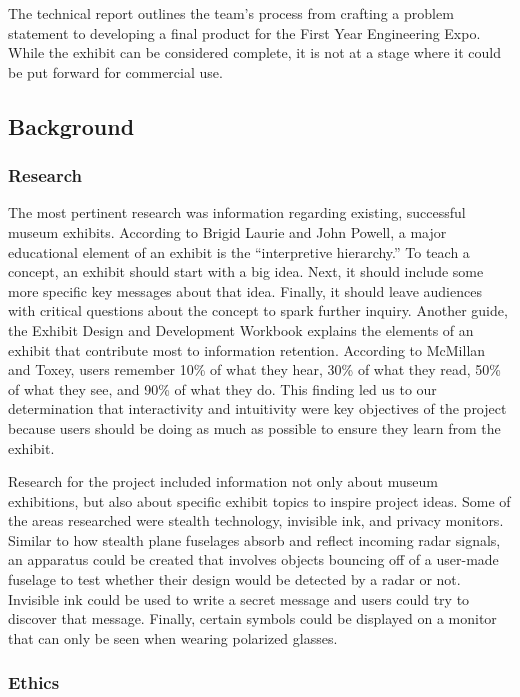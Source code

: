 \documentclass[conference]{IEEEtran}
\begin{document}
\par The technical report outlines the team’s process from crafting a problem statement to developing a final product for the First Year Engineering Expo.  While the exhibit can be considered complete, it is not at a stage where it could be put forward for commercial use. 

\subsection{Background}

\subsubsection{Research}

\par The most pertinent research was information regarding existing, successful museum exhibits.  According to Brigid Laurie and John Powell, a major educational element of an exhibit is the “interpretive hierarchy.”  To teach a concept, an exhibit should start with a big idea.  Next, it should include some more specific key messages about that idea.  Finally, it should leave audiences with critical questions about the concept to spark further inquiry. \cite{b2} Another guide, the Exhibit Design and Development Workbook explains the elements of an exhibit that contribute most to information retention.  According to McMillan and Toxey, users remember 10\% of what they hear, 30\% of what they read, 50\% of what they see, and 90\% of what they do.  This finding led us to our determination that interactivity and intuitivity were key objectives of the project because users should be doing as much as possible to ensure they learn from the exhibit.   
\par Research for the project included information not only about museum exhibitions, but also about specific exhibit topics to inspire project ideas.  Some of the areas researched were stealth technology, invisible ink, and privacy monitors.  Similar to how stealth plane fuselages absorb and reflect incoming radar signals, an apparatus could be created that involves objects bouncing off of a user-made fuselage to test whether their design would be detected by a radar or not.  Invisible ink could be used to write a secret message and users could try to discover that message.  Finally, certain symbols could be displayed on a monitor that can only be seen when wearing polarized glasses.   

\subsubsection{Ethics}
\end{document}

